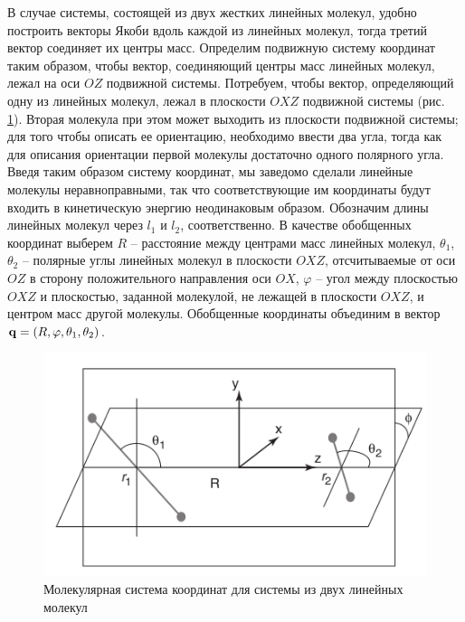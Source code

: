 В случае системы, состоящей из двух жестких линейных молекул, удобно построить векторы Якоби вдоль каждой из линейных молекул, тогда третий вектор соединяет их центры масс. Определим подвижную систему координат таким образом, чтобы вектор, соединяющий центры масс линейных молекул, лежал на оси $OZ$ подвижной системы. Потребуем, чтобы вектор, определяющий одну из линейных молекул, лежал в плоскости $OXZ$ подвижной системы (рис. \ref{fig:two-linear-molecules-body-fixed}). Вторая молекула при этом может выходить из плоскости подвижной системы; для того чтобы описать ее ориентацию, необходимо ввести два угла, тогда как для описания ориентации первой молекулы достаточно одного полярного угла. Введя таким образом систему координат, мы заведомо сделали линейные молекулы неравноправными, так что соответствующие им координаты будут входить в кинетическую энергию неодинаковым образом. Обозначим длины линейных молекул через $l_1$ и $l_2$, соответственно. В качестве обобщенных координат выберем $R$ -- расстояние между центрами масс линейных молекул, $\theta_1$, $\theta_2$ -- полярные углы линейных молекул в плоскости $OXZ$, отсчитываемые от оси $OZ$ в сторону положительного направления оси $OX$, $\varphi$ -- угол между плоскостью $OXZ$ и плоскостью, заданной молекулой, не лежащей в плоскости $OXZ$, и центром масс другой молекулы. Обобщенные координаты объединим в вектор $\mathbf{q} = \left( R, \varphi, \theta_1, \theta_2 \right)$. 

\begin{figure}[H]
    \centering
    \includegraphics[width=0.5\linewidth]{pictures/n2n2_coordinate_frame.png}
    \caption{Молекулярная система координат для системы из двух линейных молекул}
    \label{fig:two-linear-molecules-body-fixed}
\end{figure}

